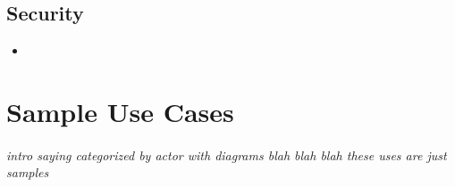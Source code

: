 \documentclass[12pt]{article}
\begin{document}
	\subsection{Security}
	\begin{itemize}
		\item 
	\end{itemize}

\section{Sample Use Cases}
\paragraph{} \textit{intro saying categorized by actor with diagrams blah blah blah these uses are just samples}

\end{document}
